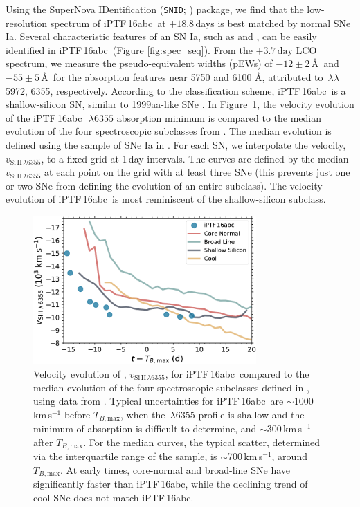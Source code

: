 \documentclass[twocolumn]{aastex61}
\newcommand{\abc}{iPTF\,16abc}
\begin{document}
Using the SuperNova IDentification (\texttt{SNID};
\citealt{2007ApJ...666.1024B}) package, we find that the low-resolution
spectrum of \abc\ at $+18.8$\,days is best matched by normal SNe Ia. Several
characteristic features of an SN Ia, such as  and , can
be easily identified in \abc\ (Figure \ref{fig:spec_seq}). From the $+3.7 \,
\mathrm{day}$ LCO spectrum, we measure the pseudo-equivalent widths (pEWs)
of $-12 \pm 2$\,\AA\ and $-55 \pm 5$\,\AA\ for the absorption features near
5750 and 6100 \AA, attributed to \,$\lambda\lambda$5972, 6355,
respectively. According to the \citet{2006PASP..118..560B} classification
scheme, \abc\ is a shallow-silicon SN, similar to 1999aa-like SNe
\citep{2009PASP..121..238B}. In Figure~\ref{fig:branch_vel}, the velocity
evolution of the \abc\ $\,\lambda6355$ absorption minimum is
compared to the median evolution of the four spectroscopic subclasses from
\citet{2006PASP..118..560B}. The median evolution is defined using the
sample of SNe Ia in \citet{2012AJ....143..126B}. For each SN, we interpolate
the  velocity, $v_{\mathrm{Si\,II}\,\lambda6355}$, to a fixed
grid at 1\,day intervals. The curves are defined by the median
$v_{\mathrm{Si\,II}\,\lambda6355}$ at each point on the grid with at least
three SNe (this prevents just one or two SNe from defining the evolution of
an entire subclass). The velocity evolution of \abc\ is most reminiscent of
the shallow-silicon subclass.

\begin{figure}[htb]
  \centering
  \includegraphics[width=3.35in]{Branch_vel_evol.pdf}
  \caption{
  Velocity evolution of ,
  $v_{\mathrm{Si\,II}\,\lambda6355}$, for \abc\ compared to the median
  evolution of the four spectroscopic subclasses defined in
  \citet{2006PASP..118..560B}, using data from \citet{2012AJ....143..126B}.
  Typical uncertainties for \abc\ are $\sim$1000\,km\,s$^{-1}$ before
  $T_{B,\mathrm{max}}$, when the $\,\lambda6355$ profile is shallow
  and the minimum of absorption is difficult to determine, and
  $\sim$300\,km\,s$^{-1}$ after $T_{B,\mathrm{max}}$. For the median curves,
  the typical scatter, determined via the interquartile range of the sample,
  is $\sim$700\,km\,s$^{-1}$, around $T_{B,\mathrm{max}}$. At early times,
  core-normal and broad-line SNe have significantly faster  than
  \abc, while the declining trend of cool SNe does not match \abc.}
  \label{fig:branch_vel}
\end{figure}
\end{document}

